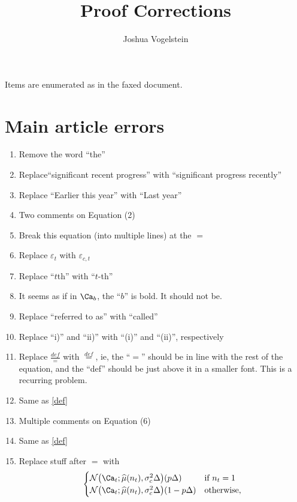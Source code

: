  
\title{Proof Corrections}
\author{Joshua Vogelstein}


\maketitle
Items are enumerated as in the faxed document.

\section{Main article errors}

\begin{enumerate}
\item Remove the word ``the''
\item Replace``significant recent progress'' with ``significant progress recently''
\item Replace ``Earlier this year'' with ``Last year''
\item Two comments on Equation (2)
\ita 
\item Break this equation (into multiple lines) at the $=$ 
\item Replace $\varepsilon_t$ with $\varepsilon_{c,t}$
\itb
\item Replace ``$t$th'' with ``$t$-th''
\item It seems as if in $\Ca_b$, the ``$b$'' is bold.  It should not be.
\item Replace ``referred to as'' with ``called''
\item Replace ``i)'' and ``ii)'' with ``(i)'' and ``(ii)'', respectively 
\item Replace $\frac{def}{=}$ with $\overset{def}{=}$, ie, the ``$=$'' should be in line with the rest of the equation, and the ``def'' should be just above it in a smaller font.  This is a recurring problem.  \label{def}
\item Same as \ref{def}
\item Multiple comments on Equation (6)
\ita
\item Same as \ref{def}
\item Replace stuff after $=$ with
\begin{align}
\begin{cases}
\mathcal{N}\big(\Ca_t; \widehat{\mu}(n_t), \sigma_c^2 \Delta\big) (p \Delta)& \text{if } n_t=1 \\
\mathcal{N}\big(\Ca_t; \widehat{\mu}(n_t), \sigma_c^2 \Delta\big) (1-p \Delta)& \text{otherwise,}\\
\end{cases}

\end{align}
\end{enumerate}
